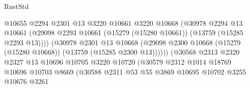 \begin{lexlean}{RustStd}
\begin{coremodule}
                                          @10655
                                          @2294
                                          @2301
                                          @13
                                          @3220
                                          @10661
                                          @3220
                                          @10668
                                          (@30978
                                            @2294
                                            @13
                                            @10661
                                            (@29098
                                              @2293
                                              @10661
                                              (@15279 (@15280 @10661))
                                              (@13759 (@15285 @2293 @13))))
                                          (@30978
                                            @2301
                                            @13
                                            @10668
                                            (@29098
                                              @2300
                                              @10668
                                              (@15279 (@15280 @10668))
                                              (@13759 (@15285 @2300 @13))))))
                                      (@30568
                                        @2313
                                        @2320
                                        @2327
                                        @13
                                        @10696
                                        @10705
                                        @3220
                                        @10720
                                        (@30579
                                          @2312
                                          @1014
                                          @18769
                                          @10696
                                          @10703
                                          @8669
                                          (@30588
                                            @2311
                                            @53
                                            @55
                                            @3869
                                            @10695
                                            @10702
                                            @3255
                                            @10676
                                            @3261

\end{coremodule}
\end{lexlean}
